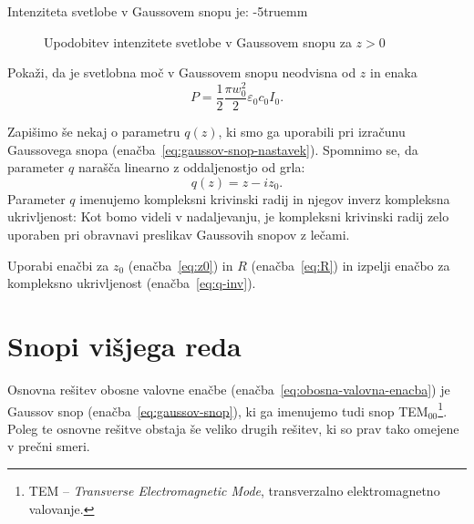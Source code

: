 Intenziteta svetlobe v Gaussovem snopu je:
\vglue-5truemm
\begin{figure}[ht]
\centering
\def\svgwidth{85truemm} 

\caption{Upodobitev intenzitete svetlobe v Gaussovem snopu za $z>0$ }
\label{fig:Gauss_3D}
\end{figure}

\begin{naloga}
\label{naloga-širina-snopa}
Pokaži, da je svetlobna moč v Gaussovem snopu neodvisna od $z$ in enaka
\begin{equation}
P = \frac{1}{2}\frac{\pi w_0^2}{2}\varepsilon_0 c_0 I_0.
\end{equation}
\end{naloga}

Zapišimo še nekaj o parametru $q(z)$, ki smo ga uporabili pri izračunu 
Gaussovega snopa (enačba~\ref{eq:gaussov-snop-nastavek}). Spomnimo 
se, da parameter $q$ narašča linearno z oddaljenostjo od grla:
\begin{equation}
q(z) = z -iz_0.
\label{eq:q}
\end{equation}
Parameter $q$ imenujemo kompleksni krivinski radij in
njegov inverz kompleksna ukrivljenost:
Kot bomo videli v nadaljevanju, je kompleksni krivinski radij 
zelo uporaben pri obravnavi preslikav Gaussovih snopov z lečami.

\begin{naloga}
Uporabi enačbi za $z_0$ (enačba~\ref{eq:z0}) in $R$ (enačba~\ref{eq:R}) in izpelji enačbo za kompleksno ukrivljenost (enačba~\ref{eq:q-inv}).
\end{naloga}

\section{Snopi višjega reda}
Osnovna rešitev obosne valovne enačbe (enačba~\ref{eq:obosna-valovna-enacba}) 
je Gaussov snop (enačba~\ref{eq:gaussov-snop}), ki ga imenujemo tudi snop 
TEM$_{00}$\footnote{TEM -- {\it Transverse Electromagnetic Mode}, 
transverzalno elektromagnetno valovanje.}. 
Poleg te osnovne rešitve obstaja še veliko drugih rešitev, ki 
so prav tako omejene v prečni smeri.

